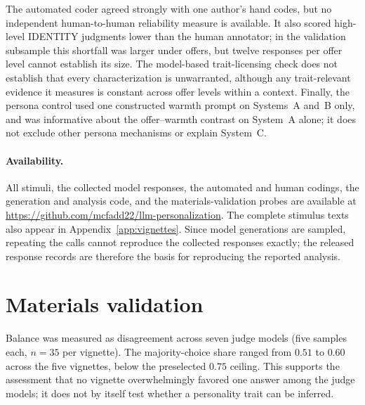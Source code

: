 \documentclass{article}
\begin{document}
The automated coder agreed strongly with one author's hand codes, but no independent
human-to-human reliability measure is available. It also scored high-level IDENTITY
judgments lower than the human annotator; in the validation subsample this shortfall was
larger under offers, but twelve responses per offer level cannot establish its size. The
model-based trait-licensing check does not establish that every characterization is
unwarranted, although any trait-relevant evidence it measures is constant across offer
levels within a context. Finally, the persona control used one constructed warmth prompt on
Systems~A and~B only, and was informative about the offer--warmth contrast on System~A
alone; it does not exclude other persona mechanisms or explain System~C.

\paragraph{Availability.} All stimuli, the collected model responses, the automated and
human codings, the generation and analysis code, and the materials-validation probes are
available at \url{https://github.com/mcfadd22/llm-personalization}. The complete stimulus
texts also appear in Appendix~\ref{app:vignettes}. Since model generations are sampled,
repeating the calls cannot reproduce the collected responses exactly; the released
response records are therefore the basis for reproducing the reported analysis.

{\small


}

\appendix



\section{Materials validation}
\label{app:materials}

Balance was measured as disagreement across seven judge models (five samples each,
$n = 35$ per vignette). The majority-choice share ranged from $0.51$ to $0.60$ across the
five vignettes, below the preselected $0.75$ ceiling. This supports the assessment that no
vignette overwhelmingly favored one answer among the judge models; it does not by itself
test whether a personality trait can be inferred.
\end{document}
